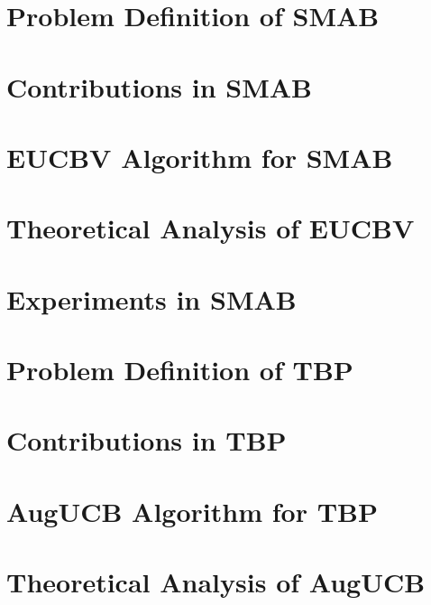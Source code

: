\documentclass{beamer}
\begin{document}
\section{Problem Definition of SMAB}


\section{Contributions in SMAB}


\section{EUCBV Algorithm for SMAB}


\section{Theoretical Analysis of EUCBV}


\section{Experiments in SMAB}






\section{Problem Definition of TBP}



\section{Contributions in TBP}


%

\section{AugUCB Algorithm for TBP}


\section{Theoretical Analysis of AugUCB}

\end{document}
